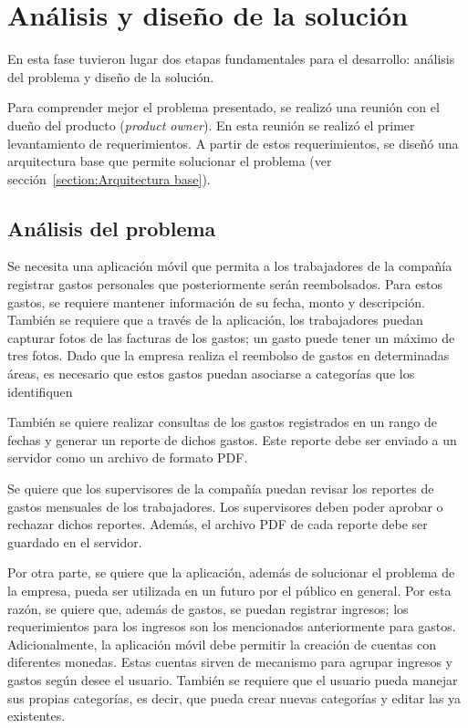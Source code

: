 \section{Análisis y diseño de la solución} \label{sect:Diseno}

En esta fase tuvieron lugar dos etapas fundamentales para el desarrollo: análisis del problema y diseño de la solución.

Para comprender mejor el problema presentado, se realizó una reunión con el dueño del producto (\textit{product owner}). En esta reunión se realizó el primer levantamiento de requerimientos. A partir de estos requerimientos, se diseñó una arquitectura base que permite solucionar el problema (ver sección~\ref{section:Arquitectura base}).

\subsection{Análisis del problema}

Se necesita una aplicación móvil que permita a los trabajadores de la compañía registrar gastos personales que posteriormente serán reembolsados. Para estos gastos, se requiere mantener información de su fecha, monto y descripción. También se requiere que a través de la aplicación, los trabajadores puedan capturar fotos de las facturas de los gastos; un gasto puede tener un máximo de tres fotos.
Dado que la empresa realiza el reembolso de gastos en determinadas áreas, es necesario que estos gastos puedan asociarse a categorías que los identifiquen

También se quiere realizar consultas de los gastos registrados en un rango de fechas y generar un reporte de dichos gastos. Este reporte debe ser enviado a un servidor como un archivo de formato PDF.

Se quiere que los supervisores de la compañía puedan revisar los reportes de gastos mensuales de los trabajadores. Los supervisores deben poder aprobar o rechazar dichos reportes. Además, el archivo PDF de cada reporte debe ser guardado en el servidor.

Por otra parte, se quiere que la aplicación, además de solucionar el problema de la empresa, pueda ser utilizada en un futuro por el público en general. Por esta razón, se quiere que, además de gastos, se puedan registrar ingresos; los requerimientos para los ingresos son los mencionados anteriormente para gastos. Adicionalmente, la aplicación móvil debe permitir la creación de cuentas con diferentes monedas. Estas cuentas sirven de mecanismo para agrupar ingresos y gastos según desee el usuario. También se requiere que el usuario pueda manejar sus propias categorías, es decir, que pueda crear nuevas categorías y editar las ya existentes.

